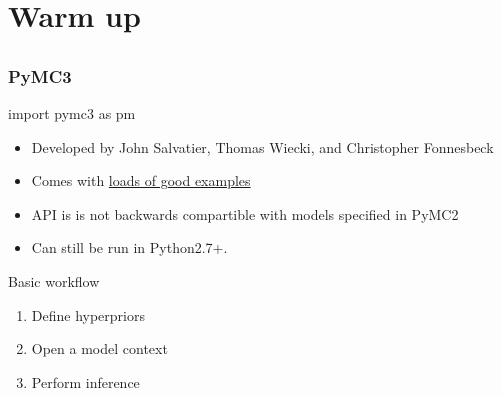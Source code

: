 \documentclass[table,dvipsnames]{beamer}
\newcommand{\highlt}{\textcolor{NavyBlue}}
\begin{document}

\section{Warm up}
\subsection{}

\begin{frame}[fragile]
\frametitle{PyMC3}
\footnotesize
\begin{code}
import pymc3 as pm
\end{code}

\begin{itemize}
 \item Developed by John Salvatier, Thomas Wiecki, and Christopher Fonnesbeck \citep{Salvatier16}
 \item Comes with \href{https://github.com/pymc-devs/pymc3/tree/master/pymc3/examples}{loads of good examples}
 \item API is is not backwards compartible with models specified in PyMC2
 \item Can still be run in Python2.7+.
\end{itemize}

\highlt{Basic workflow}
\begin{enumerate}
 \item Define hyperpriors
 \item Open a model context
 \item Perform inference
\end{enumerate}
\end{frame}
\end{document}
